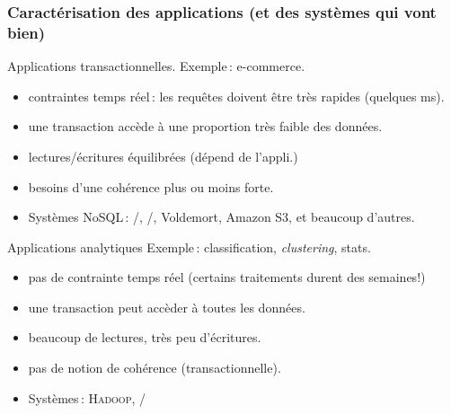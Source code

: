 \begin{frame}
\frametitle{Caractérisation des applications (et des systèmes qui vont bien)}

\alert{Applications transactionnelles}. Exemple\,: e-commerce.

 \begin{itemize}
    \item  contraintes temps réel\,: les requêtes doivent être très rapides (quelques ms).
    \item une transaction accède à une proportion très faible des données.
    \item lectures/écritures équilibrées (dépend de l'appli.)
    \item besoins d'une \alert{cohérence} plus ou moins forte.
     \item \alert{Systèmes NoSQL}\,: \mongodb/, \couchdb/, Voldemort, Amazon S3, et beaucoup d'autres.
  \end{itemize}

\alert{Applications analytiques} Exemple\,: classification, \textit{clustering}, stats.

 \begin{itemize}
    \item pas de contrainte temps réel (certains traitements durent des semaines!)
    \item une transaction peut accèder à \alert{toutes} les données.
    \item beaucoup de lectures, très peu d'écritures.
    \item pas de notion de  \alert{cohérence} (transactionnelle).
     \item \alert{Systèmes}\,: \textsc{Hadoop}, \mapreduce/
  \end{itemize}
\end{frame}




